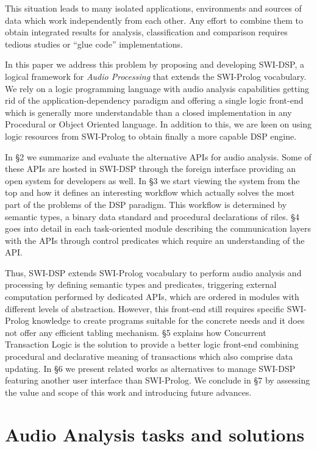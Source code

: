 \documentclass{article}
\begin{document}
This situation leads to many isolated applications, environments and sources of data which work independently from each other. Any effort to combine them to obtain integrated results for analysis, classification and comparison requires tedious studies or ``glue code'' implementations.

In this paper we address this problem by proposing and developing SWI-DSP, a logical framework for \textit{Audio Processing} that extends the SWI-Prolog vocabulary. We rely on a logic programming language with audio analysis capabilities getting rid of the application-dependency paradigm and offering a single logic front-end which is generally more understandable than a closed implementation in any Procedural or Object Oriented language. In addition to this, we are keen on using logic resources from SWI-Prolog to obtain finally a more capable DSP engine.

In \S 2 we summarize and evaluate the alternative APIs for audio analysis. Some of these APIs are hosted in SWI-DSP through the foreign interface providing an open system for developers as well. In \S 3 we start viewing the system from the top and how it defines an interesting workflow which actually solves the most part of the problems of the DSP paradigm. This workflow is determined by semantic types, a binary data standard and procedural declarations of riles. \S4 goes into detail in each task-oriented module describing the communication layers with the APIs through control predicates which require an understanding of the API.

Thus, SWI-DSP extends SWI-Prolog vocabulary to perform audio analysis and processing by defining semantic types and predicates, triggering external computation performed by dedicated APIs, which are ordered in modules with different levels of abstraction. However, this front-end still requires specific SWI-Prolog knowledge to create programs suitable for the concrete needs and it does not offer any efficient tabling mechanism. \S 5 explains how Concurrent Transaction Logic is the solution to provide a better logic front-end combining procedural and declarative meaning of transactions which also comprise data updating. In \S 6 we present related works as alternatives to manage SWI-DSP featuring another user interface than SWI-Prolog. We conclude in \S 7 by assessing the value and scope of this work and introducing future advances.

\section{Audio Analysis tasks and solutions}
\end{document}
